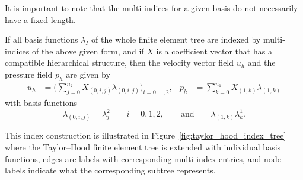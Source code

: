 \documentclass[a4paper,10pt,headings=normal,bibliography=totoc]{scrartcl}
\begin{document}
It is important to note that the multi-indices for a given basis do not necessarily
have a fixed length.

If all basis functions $\lambda_I$ of the whole finite element tree are
indexed by multi-indices of the above given form,
and if $X$ is a coefficient vector that has a compatible hierarchical structure,
then the velocity vector field $u_h$ and the pressure field $p_h$ are given by
\begin{align*}
    u_h &= \bigg( \sum_{j=0}^{n_2} X_{(0,i,j)}\lambda_{(0,i,j)}\bigg)_{i=0,\dots,2},
    &
    p_h &= \sum_{k=0}^{n_1} X_{(1,k)}\lambda_{(1,k)}
\end{align*}
with basis functions
\begin{equation*}
    \lambda_{(0,i,j)} = \lambda^2_j \qquad i=0,1,2,
    \qquad \text{and} \qquad
    \lambda_{(1,k)} \lambda^1_k.
\end{equation*}

This index construction is illustrated in Figure~\ref{fig:taylor_hood_index_tree}
where the Taylor--Hood finite element tree is extended with individual basis functions,
edges are labels with corresponding multi-index entries, and node labels indicate
what the corresponding subtree represents.
\end{document}
